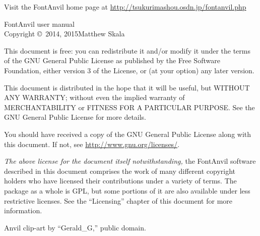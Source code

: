 \documentclass[11pt]{report}
\begin{document}
\begin{minipage}{\linewidth}
\noindent
Visit the FontAnvil home page at
\url{http://tsukurimashou.osdn.jp/fontanvil.php}

\vspace*{1in}

FontAnvil user manual\\
Copyright \copyright\ 2014, 2015\quad Matthew Skala

\vspace{\baselineskip}

This document is free: you can redistribute it and/or modify
it under the terms of the GNU General Public License as published by
the Free Software Foundation, either version 3 of the License, or
(at your option) any later version.

\vspace{\baselineskip}

This document is distributed in the hope that it will be useful,
but WITHOUT ANY WARRANTY; without even the implied warranty of
MERCHANTABILITY or FITNESS FOR A PARTICULAR PURPOSE.  See the
GNU General Public License for more details.

\vspace{\baselineskip}

You should have received a copy of the GNU General Public License
along with this document.  If not, see \url{http://www.gnu.org/licenses/}.

\vspace*{0.75in}

\emph{The above license for the document itself notwithstanding,} the
FontAnvil software described in this document comprises the work of many
different copyright holders who have licensed their contributions under a
variety of terms.  The package as a whole is GPL, but some portions of it
are also available under less restrictive licenses.  See the ``Licensing''
chapter of this document for more information.

\vspace{\baselineskip}

Anvil clip-art by ``Gerald\_{}G,'' public domain.

\end{minipage}

\clearpage


\renewcommand\contentsname{Contents}
\renewcommand{\cftbeforesubsecskip}{0pt}
\end{document}
